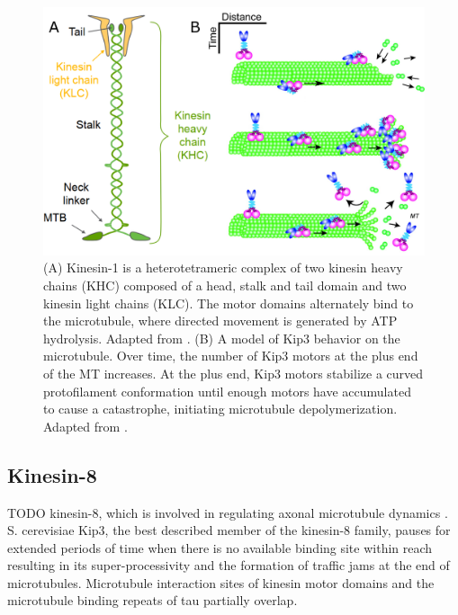 \begin{figure}[h!tb]
\centering
\includegraphics[scale=0.3]{Figures/kinesins.png}
\caption[Introduction to kinesins.]{
(A) Kinesin-1 is a heterotetrameric complex of two kinesin heavy chains (KHC) composed of a head, stalk and tail domain and two kinesin light chains (KLC). The motor domains alternately bind to the microtubule, where directed movement is generated by ATP hydrolysis. Adapted from \cite{kawaguchi}. (B) A model of Kip3 behavior on the microtubule. Over time, the number of Kip3 motors at the plus end of the MT increases. At the plus end, Kip3 motors stabilize a curved protofilament conformation until enough motors have accumulated to cause a catastrophe, initiating microtubule depolymerization. Adapted from \cite{weaver}.
	}\label{kinesins}
\end{figure}

\subsection{Kinesin-8}
\label{sec:kip3}
TODO kinesin-8, which is involved in regulating axonal microtubule dynamics \parencite{KEVENAAR2016849}. S. cerevisiae Kip3, the best described member of the kinesin-8 family, pauses for extended periods of time when there is no available binding site within reach\parencite{Varga2009} resulting in its super-processivity\parencite{Varga2006} and the formation of traffic jams at the end of microtubules\parencite{Leduc2012}. Microtubule interaction sites of kinesin motor domains and the microtubule binding repeats of tau partially overlap\parencite{Kellogg2018}. 

